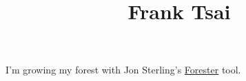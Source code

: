 \documentclass[a4paper]{article}
\title{Frank Tsai}
\begin{document}
\maketitle
\par{I'm growing my forest with Jon Sterling's \href{https://www.jonmsterling.com/jms-005P.xml}{Forester} tool.}
\printbibliography
\end{document}
